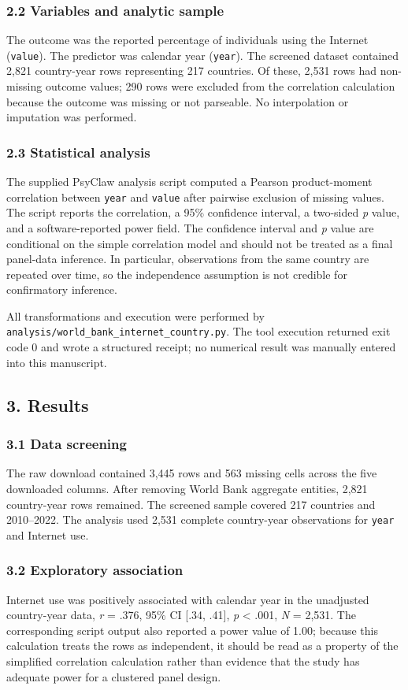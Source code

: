 \documentclass[12pt]{article}
\begin{document}
\subsubsection{2.2 Variables and analytic sample}
The outcome was the reported percentage of individuals using the Internet (\texttt{value}). The predictor was calendar year (\texttt{year}). The screened dataset contained 2,821 country-year rows representing 217 countries. Of these, 2,531 rows had non-missing outcome values; 290 rows were excluded from the correlation calculation because the outcome was missing or not parseable. No interpolation or imputation was performed.

\subsubsection{2.3 Statistical analysis}
The supplied PsyClaw analysis script computed a Pearson product-moment correlation between \texttt{year} and \texttt{value} after pairwise exclusion of missing values. The script reports the correlation, a 95\% confidence interval, a two-sided \textit{p} value, and a software-reported power field. The confidence interval and \textit{p} value are conditional on the simple correlation model and should not be treated as a final panel-data inference. In particular, observations from the same country are repeated over time, so the independence assumption is not credible for confirmatory inference.

All transformations and execution were performed by \texttt{analysis/world\_bank\_internet\_country.py}. The tool execution returned exit code 0 and wrote a structured receipt; no numerical result was manually entered into this manuscript.

\subsection{3. Results}
\subsubsection{3.1 Data screening}
The raw download contained 3,445 rows and 563 missing cells across the five downloaded columns. After removing World Bank aggregate entities, 2,821 country-year rows remained. The screened sample covered 217 countries and 2010–2022. The analysis used 2,531 complete country-year observations for \texttt{year} and Internet use.

\subsubsection{3.2 Exploratory association}
Internet use was positively associated with calendar year in the unadjusted country-year data, \textit{r} = .376, 95\% CI [.34, .41], \textit{p} < .001, \textit{N} = 2,531. The corresponding script output also reported a power value of 1.00; because this calculation treats the rows as independent, it should be read as a property of the simplified correlation calculation rather than evidence that the study has adequate power for a clustered panel design.
\end{document}
